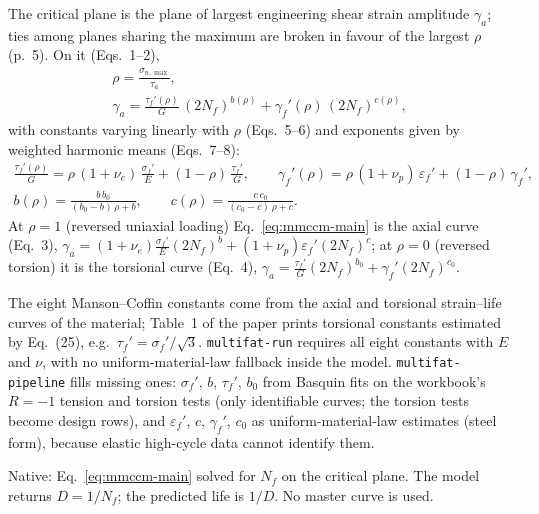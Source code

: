  The critical plane is the plane of largest engineering shear strain amplitude
$\gamma_a$; ties among planes sharing the maximum are broken in favour of the largest $\rho$
(p.~5). On it (Eqs.~1--2),
\begin{gather}
\rho=\frac{\sigma_{n,\max}}{\tau_a},
\label{eq:mmccm-rho}\\
\gamma_a=\frac{\tau_f'(\rho)}{G}\,(2N_f)^{b(\rho)}+\gamma_f'(\rho)\,(2N_f)^{c(\rho)},
\label{eq:mmccm-main}
\end{gather}
with constants varying linearly with $\rho$ (Eqs.~5--6) and exponents given by weighted harmonic
means (Eqs.~7--8):
\begin{gather}
\frac{\tau_f'(\rho)}{G}=\rho\,(1+\nu_e)\,\frac{\sigma_f'}{E}+(1-\rho)\,\frac{\tau_f'}{G},\qquad
\gamma_f'(\rho)=\rho\,(1+\nu_p)\,\varepsilon_f'+(1-\rho)\,\gamma_f',
\label{eq:mmccm-coef}\\
b(\rho)=\frac{b\,b_0}{(b_0-b)\,\rho+b},\qquad
c(\rho)=\frac{c\,c_0}{(c_0-c)\,\rho+c}.
\label{eq:mmccm-exp}
\end{gather}
At $\rho=1$ (reversed uniaxial loading) Eq.~\eqref{eq:mmccm-main} is the axial curve (Eq.~3),
$\gamma_a=(1+\nu_e)\frac{\sigma_f'}{E}(2N_f)^b+(1+\nu_p)\varepsilon_f'(2N_f)^c$; at $\rho=0$
(reversed torsion) it is the torsional curve (Eq.~4),
$\gamma_a=\frac{\tau_f'}{G}(2N_f)^{b_0}+\gamma_f'(2N_f)^{c_0}$.

 The eight Manson--Coffin constants come from the axial and
torsional strain--life curves of the material; Table~1 of the paper prints torsional constants
estimated by Eq.~(25), e.g.\ $\tau_f'=\sigma_f'/\sqrt3$. \texttt{multifat-run}
requires all eight constants with $E$ and $\nu$, with no uniform-material-law fallback inside the
model. \texttt{multifat-pipeline} fills missing ones: $\sigma_f'$, $b$, $\tau_f'$, $b_0$ from Basquin
fits on the workbook's $R=-1$ tension and torsion tests (only identifiable curves; the torsion tests
become design rows), and $\varepsilon_f'$, $c$, $\gamma_f'$, $c_0$ as uniform-material-law estimates
(steel form), because elastic high-cycle data cannot identify them.

 Native: Eq.~\eqref{eq:mmccm-main} solved for $N_f$ on the critical plane. The model
returns $D=1/N_f$; the predicted life is $1/D$. No master curve is used.

